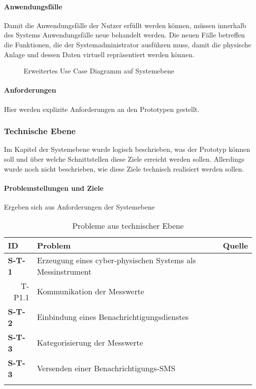 \paragraph{Anwendungsfälle}

Damit die Anwendungsfälle der Nutzer erfüllt werden können, müssen innerhalb des Systems Anwendungsfälle neue behandelt werden. Die neuen Fälle betreffen die Funktionen, die der Systemadministrator ausführen muss, damit die physische Anlage und dessen Daten virtuell repräsentiert werden können.

\begin{figure}[ht!]
  \centering
  \noindent{}
  \caption[Erweitertes Use Case Diagramm auf Systemebene]{Erweitertes Use Case Diagramm auf Systemebene}
  \label{usecasediagram}
\end{figure}
\paragraph{Anforderungen}
Hier werden explizite Anforderungen an den Prototypen gestellt.



\subsubsection{Technische Ebene}
Im Kapitel der Systemebene wurde logisch beschrieben, was der Prototyp können soll und über welche Schnittstellen diese Ziele erreicht werden sollen. Allerdings wurde noch nicht beschrieben, wie diese Ziele technisch realisiert werden sollen.

\paragraph{Problemstellungen und Ziele}
Ergeben sich aus Anforderungen der Systemebene

\begin{table}[ht!]
  \begin{tabularx}{\textwidth}{@{}lXp{2cm}@{}}
      \toprule
      ID                & Problem & Quelle \\
      \midrule
      \textbf{S-T-1}              &       Erzeugung eines cyber-physischen Systems als Messinstrument                        \\
      \multicolumn{1}{r}{T-P1.1} &  Kommunikation der Messwerte \\
      \textbf{S-T-2}              &  Einbindung eines Benachrichtigungsdienstes \\
      \textbf{S-T-3} & Kategorisierung der Messwerte \\
      \textbf{S-T-3}              &  Versenden einer Benachrichtigungs-SMS \\
      \addlinespace
      \bottomrule
  \end{tabularx}
  \label{system_probleme}
  \caption{Probleme aus technischer Ebene}
\end{table}
